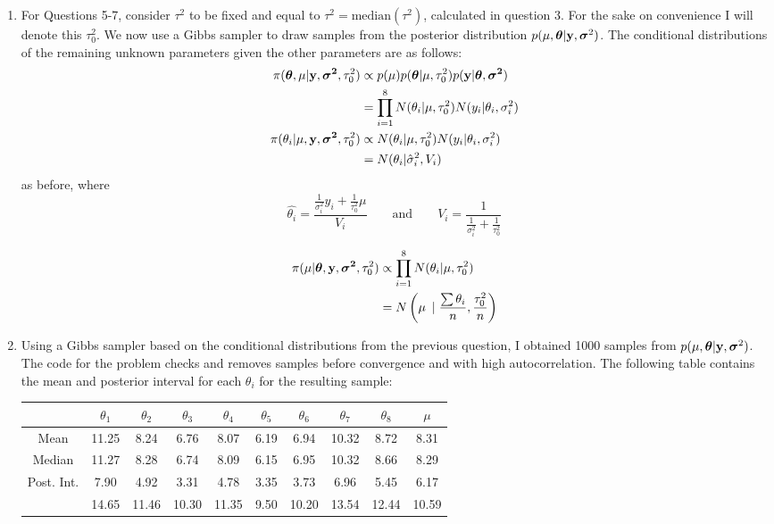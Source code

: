 \documentclass[12pt]{article}
\def\y{\mathbf{y}}
\newcommand{\si}{\mbox{\boldmath $\sigma$}}
\newcommand{\bth}{\mbox{\boldmath $\theta$}}
\begin{document}
\begin{enumerate}
	
	\item For Questions 5-7, consider $\tau^2$ to be fixed and equal to $\tau^2 = \mbox{median}(\tau^2)$, calculated in question 3. For the sake on convenience I will denote this $\tau_0^2$. We now use a Gibbs sampler to draw samples from the posterior distribution $p(\mu,\bth|\y,\si^2)$. The conditional distributions of the remaining unknown parameters given the other parameters are as follows:
	\begin{align}
		\pi(\bth, \mu | \mathbf{y}, \mathbf{\si^2}, \tau_0^2) & \propto p(\mu) p(\bth|\mu, \tau_0^2) p(\mathbf{y}| \bth, \mathbf{\si^2}) \nonumber \\
		& = \prod_{i=1}^8 N(\theta_i|\mu, \tau_0^2) N(y_i|\theta_i, \sigma_i^2) \\
		\pi(\theta_i|\mu, \mathbf{y}, \mathbf{\si^2}, \tau_0^2) & \propto N(\theta_i|\mu, \tau_0^2) N(y_i|\theta_i, \sigma_i^2) \nonumber \\
		& = N(\theta_i | \hat{\sigma}_i^2, V_i)
	\end{align}
	as before, where \[\hat{\theta_i} = \dfrac{\frac{1}{\sigma^2_i}y_i + \frac{1}{\tau_0^2}\mu}{V_i} \qquad  \mathrm{ and } \qquad V_i=\dfrac{1}{\frac{1}{\sigma^2_i} + \frac{1}{\tau_0^2}}
	\]
	
	\begin{align}
		\pi(\mu | \bth, \mathbf{y}, \mathbf{\si^2}, \tau_0^2) & \propto \prod_{i=1}^8 N( \theta_i \vert \mu, \tau_0^2) \nonumber\\
		& =  N\left(\mu\ \left\vert\right. \frac{\sum\theta_i}{n} ,  \frac{\tau_0^2}{n}\right)
	\end{align}
	
	\item Using a Gibbs sampler based on the conditional distributions from the previous question, I obtained 1000 samples from $p(\mu,\bth|\y,\si^2)$. The code for the problem checks and removes samples before convergence and with high autocorrelation. The following table contains the mean and posterior interval for each $\theta_i$ for the resulting sample:
	
	\begin{center}
		\begin{tabular}{c|ccccccccc}
	 & $\theta_1$ & $\theta_2$ & $\theta_3$ & $\theta_4$ & $\theta_5$ & $\theta_6$ & $\theta_7$ & $\theta_8$ & $\mu$\\
		\hline
	Mean & 11.25 & 8.24 & 6.76 & 8.07 & 6.19 & 6.94 & 10.32 & 8.72 & 8.31\\
	Median & 11.27 & 8.28 & 6.74 & 8.09 & 6.15 & 6.95 & 10.32 & 8.66 & 8.29\\
	Post. Int. & 7.90 & 4.92 & 3.31 & 4.78 & 3.35 & 3.73 & 6.96 & 5.45 & 6.17\\
	 & 14.65 & 11.46 & 10.30 & 11.35 & 9.50 & 10.20 & 13.54 & 12.44 & 10.59\\
		\end{tabular}
	\end{center}


\end{enumerate}
\end{document}
